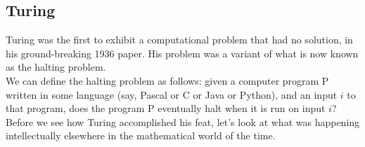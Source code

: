 \documentclass[12pt]{article}
\theoremstyle{plain}
\theoremstyle{definition}
\begin{document}
\subsection{Turing}
Turing was the first to exhibit a computational problem that had no solution, in his ground-breaking 1936 paper.
His problem was a variant of what is now known as the halting problem. \\

We can define the halting problem as follows: given a computer program P written in some language (say, Pascal or C or Java or Python), and an input $i$ to that program, does the program P eventually halt when it is run on input $i$? \\

Before we see how Turing accomplished his feat, let's look at what was happening intellectually elsewhere in the mathematical world of the time.

\clearpage
\printindex
\end{document}
